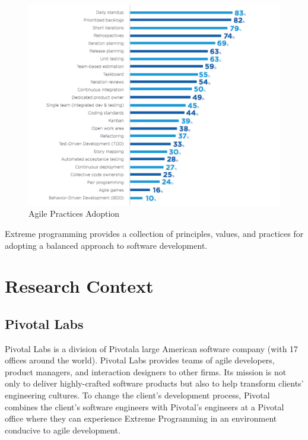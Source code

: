 \begin{figure}[t]
\centering
\includegraphics[width=\twoColumnWidth{}]{extreme_programming_images/version_one_2016_practices.png}
\caption{Agile Practices Adoption \cite{VersionOne2016Report}}
\label{VersionOne2016Practices}
\end{figure}

Extreme programming provides a collection of principles, values, and practices for adopting a balanced approach to software development. 


















\chapter{Research Context}
\label{ResearchContextChapter}

\section{Pivotal Labs}
Pivotal Labs is a division of Pivotal\textemdash a large American software company (with 17 offices around the world). Pivotal Labs provides teams of agile developers, product managers, and interaction designers to other firms. Its mission is not only to deliver highly-crafted software products but also to help transform clients' engineering cultures. To change the client's development process, Pivotal combines the client's software engineers with Pivotal's engineers at a Pivotal office where they can experience Extreme Programming \cite{BeckExtremeProgramming2004} in an environment conducive to agile development. 

